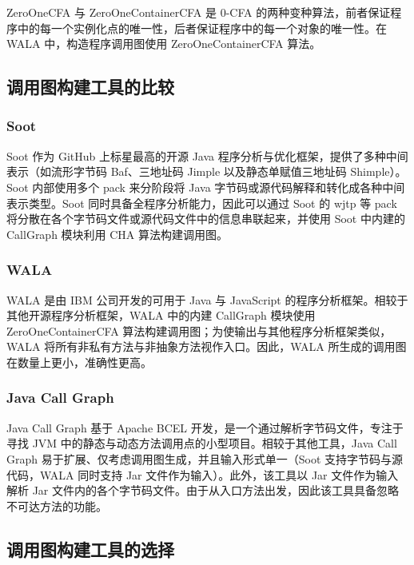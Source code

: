 ZeroOneCFA 与 ZeroOneContainerCFA 是 0-CFA 的两种变种算法，前者保证程序中的每一个实例化点的唯一性，后者保证程序中的每一个对象的唯一性。在 WALA 中，构造程序调用图使用 ZeroOneContainerCFA 算法\cite{AHybridSoftwareChangeImpactAnalysis}。

\subsection{调用图构建工具的比较}

\subsubsection{Soot}

Soot 作为 GitHub 上标星最高的开源 Java 程序分析与优化框架，提供了多种中间表示（如流形字节码 Baf、三地址码 Jimple 以及静态单赋值三地址码 Shimple）。Soot 内部使用多个 pack 来分阶段将 Java 字节码或源代码解释和转化成各种中间表示类型。Soot 同时具备全程序分析能力，因此可以通过 Soot 的 wjtp 等 pack 将分散在各个字节码文件或源代码文件中的信息串联起来，并使用 Soot 中内建的 CallGraph 模块利用 CHA 算法构建调用图。

\subsubsection{WALA}

WALA 是由 IBM 公司开发的可用于 Java 与 JavaScript 的程序分析框架。相较于其他开源程序分析框架，WALA 中的内建 CallGraph 模块使用 ZeroOneContainerCFA 算法构建调用图；为使输出与其他程序分析框架类似，WALA 将所有非私有方法与非抽象方法视作入口。因此，WALA 所生成的调用图在数量上更小，准确性更高。

\subsubsection{Java Call Graph}

Java Call Graph 基于 Apache BCEL 开发，是一个通过解析字节码文件，专注于寻找 JVM 中的静态与动态方法调用点的小型项目。相较于其他工具，Java Call Graph 易于扩展、仅考虑调用图生成，并且输入形式单一（Soot 支持字节码与源代码，WALA 同时支持 Jar 文件作为输入）。此外，该工具以 Jar 文件作为输入解析 Jar 文件内的各个字节码文件。由于从入口方法出发，因此该工具具备忽略不可达方法的功能。

\subsection{调用图构建工具的选择}

